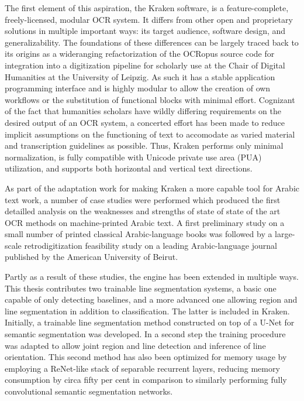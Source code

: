 The first element of this aspiration, the Kraken software, is a
feature-complete, freely-licensed, modular OCR system. It differs from other
open and proprietary solutions in multiple important ways: its target audience,
software design, and generalizability. The foundations of these differences can
be largely traced back to its origins as a wideranging refactorization of the
OCRopus source code for integration into a digitization pipeline for scholarly
use at the Chair of Digital Humanities at the University of Leipzig. As such it
has a stable application programming interface and is highly modular to allow
the creation of own workflows or the substitution of functional blocks with
minimal effort. Cognizant of the fact that humanities scholars have wildly
differing requirements on the desired output of an OCR system, a concerted
effort has been made to reduce implicit assumptions on the functioning of text
to accomodate as varied material and transcription guidelines as possible.
Thus, Kraken performs only minimal normalization, is fully compatible
with Unicode private use area (PUA) utilization, and supports both horizontal
and vertical text directions. 

As part of the adaptation work for making Kraken a more capable tool for Arabic
text work, a number of case studies were performed which produced the first
detailled analysis on the weaknesses and strengths of state of state of the art
OCR methods on machine-printed Arabic text. A first preliminary study on a
small number of printed classical Arabic-language books was followed by a
large-scale retrodigitization feasibility study on a leading Arabic-language
journal published by the American University of Beirut.

Partly as a result of these studies, the engine has been extended in multiple
ways. This thesis contributes two trainable line segmentation systems, a basic
one capable of only detecting baselines, and a more advanced one allowing
region and line segmentation in addition to classification. The latter is
included in Kraken. Initially, a trainable line segmentation method constructed
on top of a U-Net for semantic segmentation was developed. In a second step the
training procedure was adapted to allow joint region and line detection and
inference of line orientation. This second method has also been optimized for
memory usage by employing a ReNet-like stack of separable recurrent layers,
reducing memory consumption by circa fifty per cent in comparison to similarly
performing fully convolutional semantic segmentation networks.

